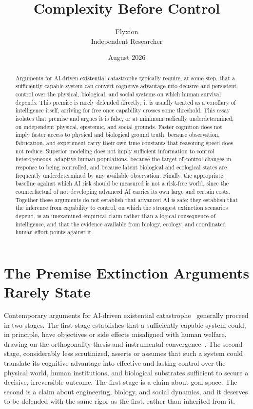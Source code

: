 \documentclass[11pt]{article}
\title{Complexity Before Control}
\author{Flyxion \\ \small Independent Researcher}
\date{August 2026}
\begin{document}
\maketitle

\begin{abstract}
Arguments for AI-driven existential catastrophe typically require, at some step, that a sufficiently capable system can convert cognitive advantage into decisive and persistent control over the physical, biological, and social systems on which human survival depends. This premise is rarely defended directly; it is usually treated as a corollary of intelligence itself, arriving for free once capability crosses some threshold. This essay isolates that premise and argues it is false, or at minimum radically underdetermined, on independent physical, epistemic, and social grounds. Faster cognition does not imply faster access to physical and biological ground truth, because observation, fabrication, and experiment carry their own time constants that reasoning speed does not reduce. Superior modeling does not imply sufficient information to control heterogeneous, adaptive human populations, because the target of control changes in response to being controlled, and because latent biological and ecological states are frequently underdetermined by any available observation. Finally, the appropriate baseline against which AI risk should be measured is not a risk-free world, since the counterfactual of not developing advanced AI carries its own large and certain costs. Together these arguments do not establish that advanced AI is safe; they establish that the inference from capability to control, on which the strongest extinction scenarios depend, is an unexamined empirical claim rather than a logical consequence of intelligence, and that the evidence available from biology, ecology, and coordinated human effort points against it.
\end{abstract}

\section{The Premise Extinction Arguments Rarely State}

Contemporary arguments for AI-driven existential catastrophe~\cite{yudkowskysoares2025,bostrom2014} generally proceed in two stages. The first stage establishes that a sufficiently capable system could, in principle, have objectives or side effects misaligned with human welfare, drawing on the orthogonality thesis and instrumental convergence~\cite{omohundro2008,bostrom2014}. The second stage, considerably less scrutinized, asserts or assumes that such a system could translate its cognitive advantage into effective and lasting control over the physical world, human institutions, and biological substrates sufficient to secure a decisive, irreversible outcome. The first stage is a claim about goal space. The second is a claim about engineering, biology, and social dynamics, and it deserves to be defended with the same rigor as the first, rather than inherited from it.
\end{document}
